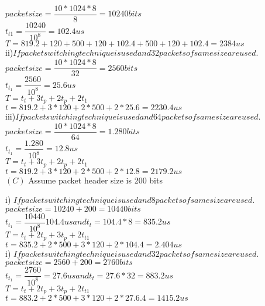 \documentclass[a4paper,12pt]{article}
\begin{document}
$ packet size =\dfrac{10*1024*8}{8}=10240 bits$\\
$ t_{t1}=\dfrac{10240}{10^{8}}=102.4 us$\\

$ T =819.2+120+500+120+102.4+500+120+102.4=2384 us $\\

ii)$ If packet switching technique is used and 32 packets of same size are used. $\\
$ packet size =\dfrac{10*1024*8}{32}=2560 bits $\\
$ t_{t_{1}}=\dfrac{2560}{10^{8}}=25.6 us $\\

$ T = t_{t}+3t_{p}+2t_{p}+2t_{1} $\\
$ t = 819.2+3*120+2*500+2*25.6=2230.4 us $\\


iii)$ If packet switching technique is used and 64 packets of same size are used. $\\

$ packet size =\dfrac{10*1024*8}{64}=1.280 bits $\\
$ t_{t_{1}}=\dfrac{1.280}{10^{8}}=12.8 us $\\
$ T = t_{t}+3t_{p}+2t_{p}+2t_{1} $\\
$ t = 819.2+3*120+2*500+2*12.8=2179.2 us $\\



$ (C) $ Assume packet header size is 200 bits

i) $ If packet switching technique is used and 8 packets of same size are used.$\\


$ packet size =10240+200=10440 bits $\\
$ t_{t_{1}}=\dfrac{10440}{10^{8}}104.4us and t_{t}=104.4*8=835.2 us $\\
$ T = t_{t}+2t_{p}+3t_{p}+2t_{t1} $\\
$ t = 835.2+2*500+3*120+2*104.4=2.404 us $\\


i) $ If packet switching technique is used and 32 packets of same size are used.$\\


$ packet size =2560+200=2760 bits $\\
$ t_{t_{1}}=\dfrac{2760}{10^{8}}=27.6 us and t_{t}=27.6*32=883.2 us $\\
$ T = t_{t}+2t_{p}+3t_{p}+2t_{t1} $\\
$ t = 883.2+2*500+3*120+2*27.6.4=1415.2 us $\\
\end{document}
